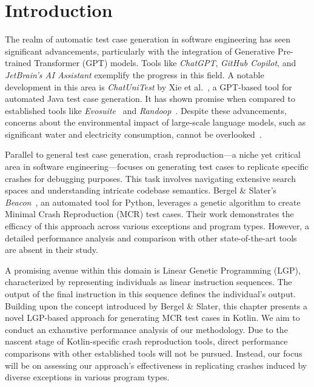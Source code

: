 \section{Introduction}
\label{sec:beacon:intro}

    The realm of automatic test case generation in software engineering has seen significant advancements, particularly 
    with the integration of Generative Pre-trained Transformer (GPT) models. Tools like \textit{ChatGPT}, 
    \textit{GitHub Copilot}, and \textit{JetBrain's AI Assistant} exemplify the progress in this field. A notable 
    development in this area is \textit{ChatUniTest} by Xie et al.~\autocite{xieChatUniTestChatGPTbasedAutomated2023}, 
    a GPT-based tool for automated Java test case generation. It has shown promise when compared to established 
    tools like \textit{Evosuite}~\autocite{fraserEvoSuiteAutomaticTest2011} and 
    \textit{Randoop}~\autocite{pachecoRandoopFeedbackdirectedRandom2007}. Despite these advancements, concerns about 
    the environmental impact of large-scale language models, such as significant water and electricity consumption, 
    cannot be overlooked~\autocite{georgeEnvironmentalImpactAI2023, UWResearcherDiscusses}.

    Parallel to general test case generation, crash reproduction—a niche yet critical area in software engineering—focuses 
    on generating test cases to replicate specific crashes for debugging purposes. This task involves navigating extensive 
    search spaces and understanding intricate codebase semantics. Bergel \& Slater's 
    \textit{Beacon}~\autocite{bergelBeaconAutomatedTest2021}, an automated tool for Python, leverages a genetic 
    algorithm to create Minimal Crash Reproduction (MCR) test cases. 
    Their work demonstrates the efficacy of this approach across various exceptions and program types. However, a 
    detailed performance analysis and comparison with other state-of-the-art tools are absent in their study.

    A promising avenue within this domain is Linear Genetic Programming (LGP), characterized by representing individuals 
    as linear instruction sequences. The output of the final instruction in this sequence defines the individual's output. 
    Building upon the concept introduced by Bergel \& Slater, this chapter presents a novel LGP-based approach for 
    generating MCR test cases in Kotlin. We aim to conduct an exhaustive performance analysis of our methodology. 
    Due to the nascent stage of Kotlin-specific crash reproduction tools, direct performance comparisons with other 
    established tools will not be pursued. Instead, our focus will be on assessing our approach's effectiveness in 
    replicating crashes induced by diverse exceptions in various program types.

